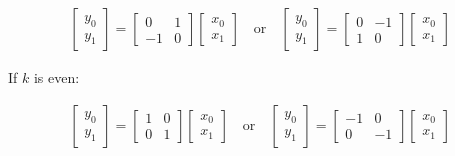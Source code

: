 \documentclass{article}
\begin{document}
\begin{align*}
    \begin{bmatrix}
        y_0 \\
        y_1 
    \end{bmatrix}
    = 
    \begin{bmatrix}
        0 & 1 \\
        -1 & 0
    \end{bmatrix}
    \begin{bmatrix}
        x_0 \\
        x_1 
    \end{bmatrix} \quad \text{or} \quad
    \begin{bmatrix}
        y_0 \\
        y_1 
    \end{bmatrix}
    = 
    \begin{bmatrix}
        0 & -1 \\
        1 & 0
    \end{bmatrix}
    \begin{bmatrix}
        x_0 \\
        x_1 
    \end{bmatrix}
\end{align*}

If $k$ is even:

\begin{align*}
    \begin{bmatrix}
        y_0 \\
        y_1 
    \end{bmatrix}
    = 
    \begin{bmatrix}
        1 & 0 \\
        0 & 1
    \end{bmatrix}
    \begin{bmatrix}
        x_0 \\
        x_1 
    \end{bmatrix} \quad \text{or} \quad
    \begin{bmatrix}
        y_0 \\
        y_1 
    \end{bmatrix}
    = 
    \begin{bmatrix}
        -1 & 0 \\
        0 & -1
    \end{bmatrix}
    \begin{bmatrix}
        x_0 \\
        x_1 
    \end{bmatrix}
\end{align*}
\end{document}
